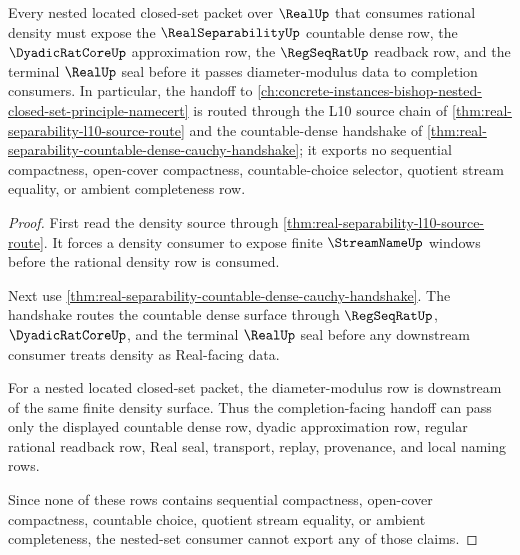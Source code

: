 \begin{theorem}
\label{thm:real-separability-nested-set-density-handoff}
Every nested located closed-set packet over $\RealUp$ that consumes rational density must expose the $\RealSeparabilityUp$ countable dense row, the $\DyadicRatCoreUp$ approximation row, the $\RegSeqRatUp$ readback row, and the terminal $\RealUp$ seal before it passes diameter-modulus data to completion consumers. In particular, the handoff to \autoref{ch:concrete-instances-bishop-nested-closed-set-principle-namecert} is routed through the L10 source chain of \autoref{thm:real-separability-l10-source-route} and the countable-dense handshake of \autoref{thm:real-separability-countable-dense-cauchy-handshake}; it exports no sequential compactness, open-cover compactness, countable-choice selector, quotient stream equality, or ambient completeness row.
\end{theorem}
\begin{proof}
First read the density source through \autoref{thm:real-separability-l10-source-route}. It forces a density consumer to expose finite $\StreamNameUp$ windows before the rational density row is consumed.

Next use \autoref{thm:real-separability-countable-dense-cauchy-handshake}. The handshake routes the countable dense surface through $\RegSeqRatUp$, $\DyadicRatCoreUp$, and the terminal $\RealUp$ seal before any downstream consumer treats density as Real-facing data.

For a nested located closed-set packet, the diameter-modulus row is downstream of the same finite density surface. Thus the completion-facing handoff can pass only the displayed countable dense row, dyadic approximation row, regular rational readback row, Real seal, transport, replay, provenance, and local naming rows.

Since none of these rows contains sequential compactness, open-cover compactness, countable choice, quotient stream equality, or ambient completeness, the nested-set consumer cannot export any of those claims.
\end{proof}

